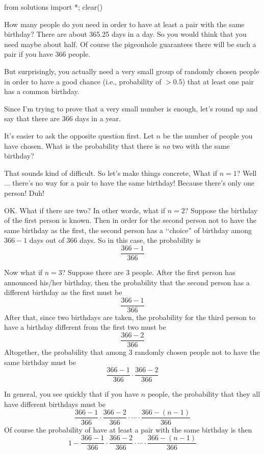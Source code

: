 \begin{python0}
from solutions import *; clear()
\end{python0}

How many people do you need in order to have at least a pair with
the same birthday?
There are about 365.25 days in a day.
So you would think that you need maybe about half.
Of course the pigeonhole guarantees there will be such a pair if
you have 366 people.

But surprisingly, you actually need a very small group of randomly
chosen people in order to have a good chance (i.e., probability of $> 0.5$)
that at least one pair
has a common birthday.

Since I'm trying to prove that a very small number is enough,
let's round up and say that there are 366 days in a year.

It's easier to ask the opposite question first.
Let $n$ be the number of people you have chosen.
What is the probability that there is \textit{no} two with the same
birthday?

That sounds kind of difficult.
So let's make things concrete,
What if $n = 1$? 
Well ... there's no way for a pair to have the same birthday!
Because there's only one person!
Duh!

OK.
What if there are two?
In other words, what if $n = 2$?
Suppose the birthday of the first person is known.
Then in order for the second person not to have the same birthday
as the first, the second person has a \lq\lq choice'' of birthday
among $366 - 1$ days out of 366 days.
So in this case, the probability is
\[
\frac{366 - 1}{366}
\]

Now what if $n = 3$?
Suppose there are 3 people.
After the first person has announced his/her birthday,
then the probability that the second person has a different birthday as
the first must be 
\[
\frac{366 - 1}{366}
\]
After that, since two birthdays are taken, the probability for the third
person to have a birthday different from the first two must be 
\[
\frac{366 - 2}{366}
\]
Altogether, the probability that among 3 randomly chosen people not to have
the same birthday must be 
\[
\frac{366 - 1}{366} \cdot 
\frac{366 - 2}{366}
\]

In general, you see quickly that if you have $n$ people, the probability
that they all have different birthdays must be 
\[
\frac{366 - 1}{366} \cdot 
\frac{366 - 2}{366} \cdot \cdots \cdot
\frac{366 - (n - 1)}{366}
\]
Of course the probability of have at least a pair with the same
birthday is then
\[
1 - \frac{366 - 1}{366} \cdot 
\frac{366 - 2}{366} \cdot \cdots \cdot
\frac{366 - (n - 1)}{366}
\]

